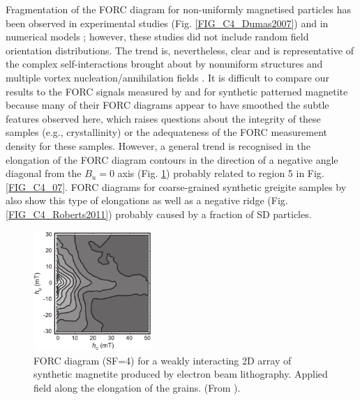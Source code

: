 Fragmentation of the FORC diagram for non-uniformly magnetised particles has been observed in experimental studies \citep{Pike1999B,Dumas2007,Roberts2017,Zhao2017} (Fig. \ref{FIG_C4_Dumas2007}) and in numerical models \citep{Carvallo2003,Roberts2017}; however, these studies did not include random field orientation distributions. The trend is, nevertheless, clear and is representative of the complex self-interactions brought about by nonuniform structures and multiple vortex nucleation/annihilation fields \citep{Pike1999B}. It is difficult to compare our results to the FORC signals measured by \citet{Muxworthy2006B} and \citet{Krasa2011} for synthetic patterned magnetite because many of their FORC diagrams appear to have smoothed the subtle features observed here, which raises questions about the integrity of these samples (e.g., crystallinity) or the adequateness of the FORC measurement density for these samples. However, a general trend is recognised in the elongation of the FORC diagram contours in the direction of a negative angle diagonal from the $B_u=0$ axis (Fig. \ref{FIG_C4_Muxworthy2006B}) probably related to region 5 in Fig. \ref{FIG_C4_07}. FORC diagrams for coarse-grained synthetic greigite samples by \citet{Roberts2011} also show this type of elongations as well as a negative ridge (Fig. \ref{FIG_C4_Roberts2011}) probably caused by a fraction of SD particles.
\begin{figure}
\centering
\includegraphics[width=0.4\textwidth]{research-3/figs/Muxworthy2006B.pdf}
\caption[FORC diagram of a synthetic magnetite 2D array]{FORC diagram (SF=4) for a weakly interacting 2D array of synthetic magnetite produced by electron beam lithography. Applied field along the elongation of the grains. (From \citet{Muxworthy2006B}).}
\label{FIG_C4_Muxworthy2006B}
\end{figure}\par


